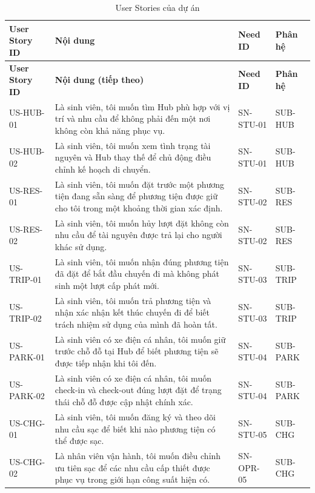 \begingroup
\small
\begin{longtable}{|L{22mm}|L{72mm}|L{23mm}|L{20mm}|}
  \caption{User Stories của dự án}\label{tab:user-stories}\\
  \hline
  \textbf{User Story ID} & \centering\arraybackslash\textbf{Nội dung} & \textbf{Need ID} & \textbf{Phân hệ}\\
  \hline
  \endfirsthead
  \hline
  \textbf{User Story ID} & \centering\arraybackslash\textbf{Nội dung (tiếp theo)} & \textbf{Need ID} & \textbf{Phân hệ}\\
  \hline
  \endhead
  US-HUB-01 & Là sinh viên, tôi muốn tìm Hub phù hợp với vị trí và nhu cầu để không phải đến một nơi không còn khả năng phục vụ. & SN-STU-01 & SUB-HUB\\
  \hline
  US-HUB-02 & Là sinh viên, tôi muốn xem tình trạng tài nguyên và Hub thay thế để chủ động điều chỉnh kế hoạch di chuyển. & SN-STU-01 & SUB-HUB\\
  \hline
  US-RES-01 & Là sinh viên, tôi muốn đặt trước một phương tiện đang sẵn sàng để phương tiện được giữ cho tôi trong một khoảng thời gian xác định. & SN-STU-02 & SUB-RES\\
  \hline
  US-RES-02 & Là sinh viên, tôi muốn hủy lượt đặt không còn nhu cầu để tài nguyên được trả lại cho người khác sử dụng. & SN-STU-02 & SUB-RES\\
  \hline
  US-TRIP-01 & Là sinh viên, tôi muốn nhận đúng phương tiện đã đặt để bắt đầu chuyến đi mà không phát sinh một lượt cấp phát mới. & SN-STU-03 & SUB-TRIP\\
  \hline
  US-TRIP-02 & Là sinh viên, tôi muốn trả phương tiện và nhận xác nhận kết thúc chuyến đi để biết trách nhiệm sử dụng của mình đã hoàn tất. & SN-STU-03 & SUB-TRIP\\
  \hline
  US-PARK-01 & Là sinh viên có xe điện cá nhân, tôi muốn giữ trước chỗ đỗ tại Hub để biết phương tiện sẽ được tiếp nhận khi tôi đến. & SN-STU-04 & SUB-PARK\\
  \hline
  US-PARK-02 & Là sinh viên có xe điện cá nhân, tôi muốn check-in và check-out đúng lượt đặt để trạng thái chỗ đỗ được cập nhật chính xác. & SN-STU-04 & SUB-PARK\\
  \hline
  US-CHG-01 & Là sinh viên, tôi muốn đăng ký và theo dõi nhu cầu sạc để biết khi nào phương tiện có thể được sạc. & SN-STU-05 & SUB-CHG\\
  \hline
  US-CHG-02 & Là nhân viên vận hành, tôi muốn điều chỉnh ưu tiên sạc để các nhu cầu cấp thiết được phục vụ trong giới hạn công suất hiện có. & SN-OPR-05 & SUB-CHG\\

\end{longtable}
